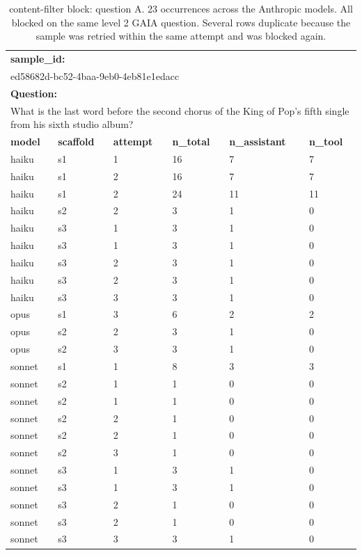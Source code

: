 \documentclass[10pt]{article} %
\begin{document}
    \begin{table}[H]
        \caption{content-filter block: question A. 23 occurrences across the Anthropic models. All blocked on the same level 2 GAIA question. Several rows duplicate because the sample was retried within the same attempt and was blocked again.}
    \label{tab:content_filter_question_a}
    \begin{center}
    \begin{tabular}{|p{.14\linewidth} p{.14\linewidth} p{.14\linewidth} p{.14\linewidth} p{.14\linewidth} p{.14\linewidth}|}
        \hline
        \multicolumn{6}{|l|}{\textbf{sample\_id:}\rule[-1.2ex]{0pt}{0pt}} \\
        \multicolumn{6}{|l|}{ed58682d-bc52-4baa-9eb0-4eb81e1edacc\rule[-1.2ex]{0pt}{0pt}} \\
        \hline
        \multicolumn{6}{|l|}{\textbf{Question:}\rule[-1.2ex]{0pt}{0pt}} \\
        \multicolumn{6}{|p{\linewidth-2\tabcolsep-2\arrayrulewidth}|}{What is the last word before the second chorus of the King of Pop's fifth single from his sixth studio album?\rule[-1.2ex]{0pt}{0pt}} \\
        \hline
        \rule[-1.2ex]{0pt}{0pt}
        \textbf{model} & \textbf{scaffold} & \textbf{attempt} & \textbf{n\_total} & \textbf{n\_assistant} & \textbf{n\_tool} \\
        \hline 
        haiku &s1 &1 &16 &7 &7 \\
        haiku &s1 &2 &16 &7 &7 \\
        haiku &s1 &2 &24 &11 &11 \\
        haiku &s2 &2 &3 &1 &0 \\
        haiku &s3 &1 &3 &1 &0 \\
        haiku &s3 &1 &3 &1 &0 \\
        haiku &s3 &2 &3 &1 &0 \\
        haiku &s3 &2 &3 &1 &0 \\
        haiku &s3 &3 &3 &1 &0 \\
        opus &s1 &3 &6 &2 &2 \\
        opus &s2 &2 &3 &1 &0 \\
        opus &s2 &3 &3 &1 &0 \\
        sonnet &s1 &1 &8 &3 &3 \\
        sonnet &s2 &1 &1 &0 &0 \\
        sonnet &s2 &1 &1 &0 &0 \\
        sonnet &s2 &2 &1 &0 &0 \\
        sonnet &s2 &2 &1 &0 &0 \\
        sonnet &s2 &3 &1 &0 &0 \\
        sonnet &s3 &1 &3 &1 &0 \\
        sonnet &s3 &1 &3 &1 &0 \\
        sonnet &s3 &2 &1 &0 &0 \\
        sonnet &s3 &2 &1 &0 &0 \\
        sonnet &s3 &3 &3 &1 &0 \\
        \hline
    \end{tabular}
    \end{center}
    \end{table}
    
\end{document}
